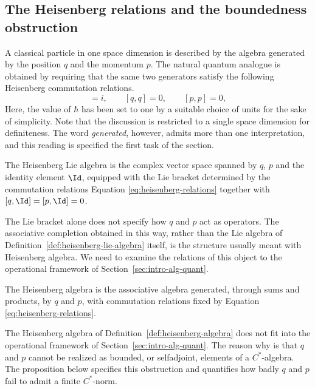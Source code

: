 	\subsection*{The Heisenberg relations and the boundedness obstruction}
	
	A classical particle in one space dimension is described by the algebra generated by the position $q$ and the momentum $p$. The natural quantum analogue is obtained by requiring that the same two generators satisfy the following Heisenberg commutation relations.
	\begin{equation}
		[q,p]=i, \qquad [q,q]=0, \qquad [p,p]=0,
		\label{eq:heisenberg-relations}
	\end{equation}
	 Here, the value of $\hbar$ has been set to one by a suitable choice of units for the sake of simplicity. Note that the discussion is restricted to a single space dimension for definiteness. The word \emph{generated}, however, admits more than one interpretation, and this reading is specified the first task of the section.
	
	\begin{definition}
		\label{def:heisenberg-lie-algebra}
		The Heisenberg Lie algebra is the complex vector space spanned by $q$, $p$ and the identity element $\Id$, equipped with the Lie bracket determined by the commutation relations Equation \eqref{eq:heisenberg-relations} together with $[q,\Id]=[p,\Id]=0$.
	\end{definition}
	
	\noindent The Lie bracket alone does not specify how $q$ and $p$ act as operators. The associative completion obtained in this way, rather than the Lie algebra of Definition~\ref{def:heisenberg-lie-algebra} itself, is the structure usually meant with Heisenberg algebra. We need to examine the relations of this object to the operational framework of Section~\ref{sec:intro-alg-quant}.
	
	\begin{definition}
		\label{def:heisenberg-algebra}
		The Heisenberg algebra is the associative algebra generated, through sums and products, by $q$ and $p$, with commutation relations fixed by Equation \eqref{eq:heisenberg-relations}.
	\end{definition}
	
	\noindent The Heisenberg algebra of Definition~\ref{def:heisenberg-algebra} does not fit into the operational framework of Section~\ref{sec:intro-alg-quant}. The reason why is that $q$ and $p$ cannot be realized as bounded, or selfadjoint, elements of a $C^*$-algebra. The proposition below specifies this obstruction and quantifies how badly $q$ and $p$ fail to admit a finite $C^*$-norm.
	
